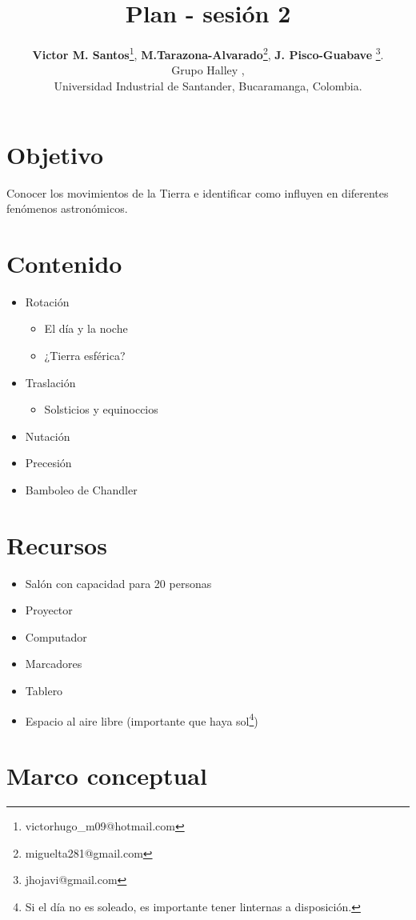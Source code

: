 \documentclass[10pt,a4paper]{article}
\title{Plan - sesión 2}
\author{\textbf{Victor M. Santos}\thanks{victorhugo\_m09@hotmail.com}, \textbf{M.Tarazona-Alvarado}\thanks{miguelta281@gmail.com}, \textbf{J. Pisco-Guabave} \thanks{jhojavi@gmail.com}. \\ Grupo Halley , \\ Universidad Industrial de Santander, Bucaramanga, Colombia.}
\date{ }
\begin{document}
\maketitle
\tableofcontents
\section{Objetivo}
Conocer los movimientos de la Tierra e identificar como influyen en diferentes fenómenos  astronómicos.

\section{Contenido}
\begin{itemize}
 \item Rotación
 \begin{itemize}
  \item El día y la noche
  \item ¿Tierra esférica?
 \end{itemize}
 \item Traslación
 \begin{itemize}
  \item Solsticios y equinoccios
 \end{itemize}
 \item Nutación
 \item Precesión
 \item Bamboleo de Chandler
\end{itemize}


\section{Recursos}
\begin{itemize}
 \item Salón con capacidad para 20 personas
 \item Proyector
 \item Computador
 \item Marcadores
 \item Tablero
 \item Espacio al aire libre (importante que haya sol\footnote{Si el día no es soleado, es importante tener linternas a disposición.})
\end{itemize}

\section{Marco conceptual}
\end{document}
